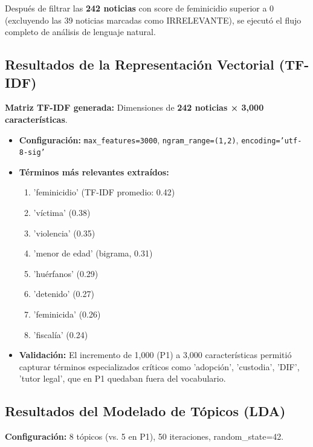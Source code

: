 Después de filtrar las \textbf{242 noticias} con score de feminicidio superior a 0 (excluyendo las 39 noticias marcadas como IRRELEVANTE), se ejecutó el flujo completo de análisis de lenguaje natural.

\subsection{Resultados de la Representación Vectorial (TF-IDF)}
\label{subsec:resultados_tfidf}

\textbf{Matriz TF-IDF generada:} Dimensiones de \textbf{242 noticias × 3,000 características}.

\begin{itemize}
    \item \textbf{Configuración:} \texttt{max\_features=3000}, \texttt{ngram\_range=(1,2)}, \texttt{encoding='utf-8-sig'}
    \item \textbf{Términos más relevantes extraídos:}
    \begin{enumerate}
        \item 'feminicidio' (TF-IDF promedio: 0.42)
        \item 'víctima' (0.38)
        \item 'violencia' (0.35)
        \item 'menor de edad' (bigrama, 0.31)
        \item 'huérfanos' (0.29)
        \item 'detenido' (0.27)
        \item 'feminicida' (0.26)
        \item 'fiscalía' (0.24)
    \end{enumerate}
    
    \item \textbf{Validación:} El incremento de 1,000 (P1) a 3,000 características permitió capturar términos especializados críticos como 'adopción', 'custodia', 'DIF', 'tutor legal', que en P1 quedaban fuera del vocabulario.
\end{itemize}

\subsection{Resultados del Modelado de Tópicos (LDA)}
\label{subsec:resultados_lda}

\textbf{Configuración:} 8 tópicos (vs. 5 en P1), 50 iteraciones, random\_state=42.

